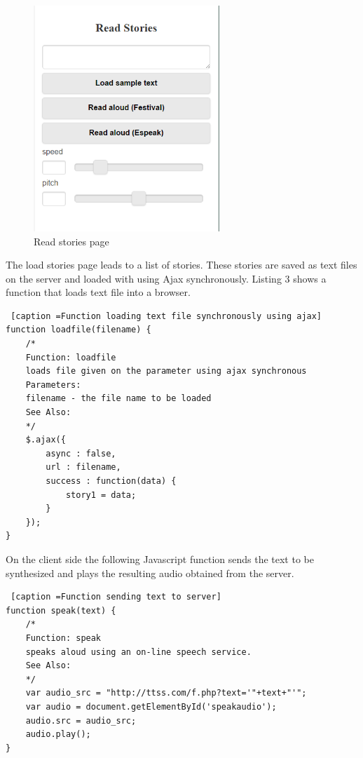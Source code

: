 \documentclass[11pt,a4paper,oneside,article]{memoir}
\begin{document}
\begin{figure}[!h]
\includegraphics[width=7cm]{reading}
\caption{ Read stories page}
\label{fig:reading}
\end{figure}

The load stories page leads to a list of stories. These stories are saved as text files on the server and loaded with using Ajax synchronously. Listing 3 shows a function that loads text file into a browser.


\begin{minipage}{\linewidth}
\begin{lstlisting} [caption =Function loading text file synchronously using ajax]
function loadfile(filename) {
    /*
    Function: loadfile
    loads file given on the parameter using ajax synchronous
    Parameters:
    filename - the file name to be loaded                            
    See Also:       
    */
    $.ajax({
        async : false,
        url : filename,
        success : function(data) {
            story1 = data;
        }
    });
}

\end{lstlisting}
\end{minipage}

On the client side the following Javascript function sends the text to be synthesized and plays the resulting audio obtained from the server.

\begin{minipage}{\linewidth}
\begin{lstlisting} [caption =Function sending text to server]
function speak(text) {
    /*
    Function: speak
    speaks aloud using an on-line speech service.
    See Also:						
    */
    var audio_src = "http://ttss.com/f.php?text='"+text+"'";							
    var audio = document.getElementById('speakaudio');
    audio.src = audio_src;
    audio.play();						
}
\end{lstlisting}
\end{minipage}
\end{document}

